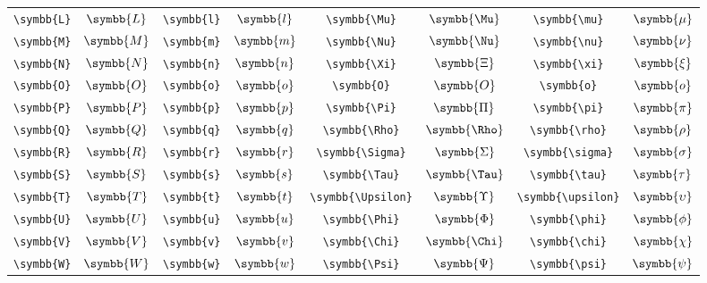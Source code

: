 \begin{longtable}{cccccccc}
    \verb|\symbb{L}| & \(\symbb{L}\) & \verb|\symbb{l}| & \(\symbb{l}\) & \verb|\symbb{\Mu}|      & \(\symbb{\Mu}\)      & \verb|\symbb{\mu}|         & \(\symbb{\mu}\)         \\
    \verb|\symbb{M}| & \(\symbb{M}\) & \verb|\symbb{m}| & \(\symbb{m}\) & \verb|\symbb{\Nu}|      & \(\symbb{\Nu}\)      & \verb|\symbb{\nu}|         & \(\symbb{\nu}\)         \\
    \verb|\symbb{N}| & \(\symbb{N}\) & \verb|\symbb{n}| & \(\symbb{n}\) & \verb|\symbb{\Xi}|      & \(\symbb{\Xi}\)      & \verb|\symbb{\xi}|         & \(\symbb{\xi}\)         \\
    \verb|\symbb{O}| & \(\symbb{O}\) & \verb|\symbb{o}| & \(\symbb{o}\) & \verb|\symbb{O}|        & \(\symbb{O}\)        & \verb|\symbb{o}|           & \(\symbb{o}\)           \\
    \verb|\symbb{P}| & \(\symbb{P}\) & \verb|\symbb{p}| & \(\symbb{p}\) & \verb|\symbb{\Pi}|      & \(\symbb{\Pi}\)      & \verb|\symbb{\pi}|         & \(\symbb{\pi}\)         \\
    \verb|\symbb{Q}| & \(\symbb{Q}\) & \verb|\symbb{q}| & \(\symbb{q}\) & \verb|\symbb{\Rho}|     & \(\symbb{\Rho}\)     & \verb|\symbb{\rho}|        & \(\symbb{\rho}\)        \\
    \verb|\symbb{R}| & \(\symbb{R}\) & \verb|\symbb{r}| & \(\symbb{r}\) & \verb|\symbb{\Sigma}|   & \(\symbb{\Sigma}\)   & \verb|\symbb{\sigma}|      & \(\symbb{\sigma}\)      \\
    \verb|\symbb{S}| & \(\symbb{S}\) & \verb|\symbb{s}| & \(\symbb{s}\) & \verb|\symbb{\Tau}|     & \(\symbb{\Tau}\)     & \verb|\symbb{\tau}|        & \(\symbb{\tau}\)        \\
    \verb|\symbb{T}| & \(\symbb{T}\) & \verb|\symbb{t}| & \(\symbb{t}\) & \verb|\symbb{\Upsilon}| & \(\symbb{\Upsilon}\) & \verb|\symbb{\upsilon}|    & \(\symbb{\upsilon}\)    \\
    \verb|\symbb{U}| & \(\symbb{U}\) & \verb|\symbb{u}| & \(\symbb{u}\) & \verb|\symbb{\Phi}|     & \(\symbb{\Phi}\)     & \verb|\symbb{\phi}|        & \(\symbb{\phi}\)        \\
    \verb|\symbb{V}| & \(\symbb{V}\) & \verb|\symbb{v}| & \(\symbb{v}\) & \verb|\symbb{\Chi}|     & \(\symbb{\Chi}\)     & \verb|\symbb{\chi}|        & \(\symbb{\chi}\)        \\
    \verb|\symbb{W}| & \(\symbb{W}\) & \verb|\symbb{w}| & \(\symbb{w}\) & \verb|\symbb{\Psi}|     & \(\symbb{\Psi}\)     & \verb|\symbb{\psi}|        & \(\symbb{\psi}\)        \\

\end{longtable}
